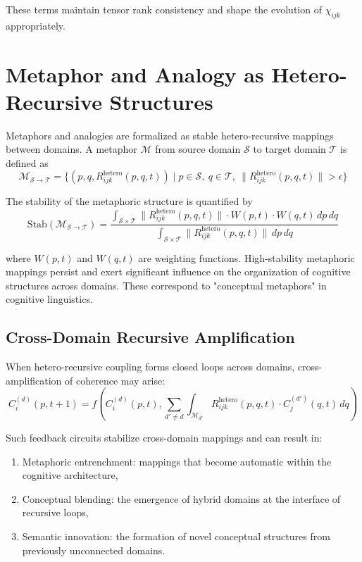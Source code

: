 These terms maintain tensor rank consistency and shape the evolution of \(\chi_{ijk}\) appropriately.

\section{Metaphor and Analogy as Hetero-Recursive Structures}

Metaphors and analogies are formalized as stable hetero-recursive mappings between domains. A metaphor \(\mathcal{M}\) from source domain \(\mathcal{S}\) to target domain \(\mathcal{T}\) is defined as
\begin{equation}
\mathcal{M}_{\mathcal{S} \to \mathcal{T}} = \{(p, q, R_{ijk}^{\text{hetero}}(p, q, t)) \mid p \in \mathcal{S},\ q \in \mathcal{T},\ \|R_{ijk}^{\text{hetero}}(p, q, t)\| > \epsilon\}
\end{equation}

The stability of the metaphoric structure is quantified by
\begin{equation}
\text{Stab}(\mathcal{M}_{\mathcal{S} \to \mathcal{T}}) = \frac{\int_{\mathcal{S} \times \mathcal{T}} \|R_{ijk}^{\text{hetero}}(p, q, t)\| \cdot W(p, t) \cdot W(q, t) \, dp \, dq}{\int_{\mathcal{S} \times \mathcal{T}} \|R_{ijk}^{\text{hetero}}(p, q, t)\| \, dp \, dq}
\end{equation}

where \(W(p, t)\) and \(W(q, t)\) are weighting functions. High-stability metaphoric mappings persist and exert significant influence on the organization of cognitive structures across domains. These correspond to "conceptual metaphors" in cognitive linguistics.

\subsection{Cross-Domain Recursive Amplification}

When hetero-recursive coupling forms closed loops across domains, cross-amplification of coherence may arise:
\begin{equation}
C_i^{(d)}(p, t+1) = f\left(C_i^{(d)}(p, t), \sum_{d' \neq d} \int_{\mathcal{M}_{d'}} R_{ijk}^{\text{hetero}}(p, q, t) \cdot C_j^{(d')}(q, t) \, dq\right)
\end{equation}

Such feedback circuits stabilize cross-domain mappings and can result in:
\begin{enumerate}
    \item Metaphoric entrenchment: mappings that become automatic within the cognitive architecture,
    \item Conceptual blending: the emergence of hybrid domains at the interface of recursive loops,
    \item Semantic innovation: the formation of novel conceptual structures from previously unconnected domains.
\end{enumerate}